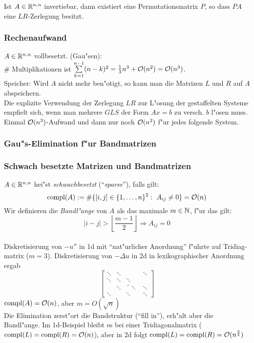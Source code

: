 \documentclass{scrartcl}
\begin{document}
\begin{Satz}
Ist $A \in \mathbb{R}^{n,n}$ invertiebar, dann existiert eine Permutationsmatrix $P$, so dass $PA$ eine $LR$-Zerlegung besitzt.
\end{Satz}

\subsubsection{Rechenaufwand}
$A \in \mathbb{R}^{n,n}$ vollbesetzt. (Gau"sen): \\
\# Multiplikationen ist $\sum\limits_{k=1}^{n-1} (n-k)^2 = \frac{1}{3} n^3 + \mathcal{O} (n^2) = \mathcal{O}(n^3)$. \\
Speicher: Wird $A$ nicht mehr ben"otigt, so kann man die Matrizen $L$ und $R$ auf $A$ abspeichern. \\
Die explizite Verwendung der Zerlegung $LR$ zur L"osung der gestaffelten Systeme empfielt sich, wenn man mehrere $GLS$ der Form $Ax = b$ zu versch. $b$ l"osen muss. Einmal $\mathcal{O} (n^3)$-Aufwand und dann nur noch $\mathcal{O} (n^2)$ f"ur jedes folgende System.

\subsubsection{Gau"s-Elimination f"ur Bandmatrizen}

\subsubsection*{Schwach besetzte Matrizen und Bandmatrizen} 

$A \in \mathbb{R}^{n,n}$ hei"st \emph{schwachbesetzt} ("`\emph{sparse}"'), falls gilt:
$$ \mathrm{compl}(A) := \# \{ [i,j] \in \{ 1, \ldots, n \}^2: \ A_{ij} \neq 0 \} = \mathcal{O}(n)$$
Wir definieren die \emph{Bandl"ange} von $A$ als das maximale $m \in \mathbb{N}$, f"ur das gilt:
$$ \vert i - j \vert > \left\lfloor \frac{m-1}{2} \right\rfloor \Rightarrow A_{ij} = 0$$ \\
Diskretisierung von $-u''$ in 1d mit "`nat"urlicher Anordnung"' f"uhrte auf Tridiag-matrix ($m=3$). Diskretisierung von $- \Delta u$ in 2d in lexikographischer Anordnung ergab
$$
\left[
\begin{matrix}
\ddots & \ddots & & \ddots \\
\ddots & \ddots & \ddots & \\
  & \ddots & ´\ddots & \ddots \\
\ddots & & \ddots & \ddots 
\end{matrix}
\right]$$
$\mathrm{compl}(A) = \mathcal{O}(n)$, aber $m = O(\sqrt{n})$ \\
Die Elimination zerst"ort die Bandstruktur ("`fill in"'), erh"alt aber die Bandl"ange. Im 1d-Beispiel bleibt es bei einer Tridiagonalmatrix ( $\mathrm{compl}(L) = \mathrm{compl}(R) = \mathcal{O}(n)$), aber in 2d folgt $\mathrm{compl}(L) = \mathrm{compl}(R) = \mathcal{O} (n^{\frac{3}{2}})$ 
\end{document}
